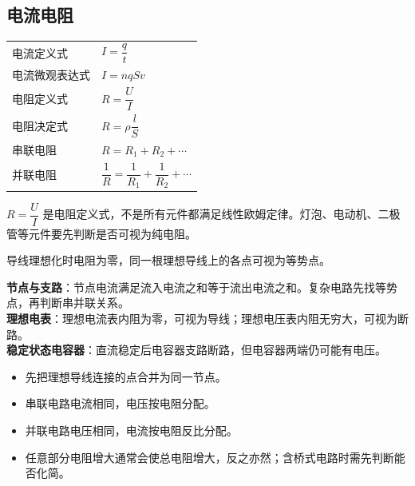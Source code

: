 
\subsection{电流电阻}

\begin{tabularx}{\columnwidth}{XX}
  电流定义式&$I=\dfrac{q}{t}$\\
  电流微观表达式&$I=nqSv$\\
  电阻定义式&$R=\dfrac{U}{I}$\\
  电阻决定式&$R=\rho\dfrac{l}{S}$\\
  串联电阻&$R=R_1+R_2+\cdots$\\
  并联电阻&$\dfrac1R=\dfrac1{R_1}+\dfrac1{R_2}+\cdots$\\
\end{tabularx}

\begin{formulanotebox}
$R=\dfrac{U}{I}$ 是电阻定义式，不是所有元件都满足线性欧姆定律。灯泡、电动机、二极管等元件要先判断是否可视为纯电阻。

导线理想化时电阻为零，同一根理想导线上的各点可视为等势点。
\end{formulanotebox}

\begin{keypointbox}[title={\strut\textcolor{white}{\bfseries 重点知识点：电路基本认识}}]
\textbf{节点与支路}：节点电流满足流入电流之和等于流出电流之和。复杂电路先找等势点，再判断串并联关系。\\

\textbf{理想电表}：理想电流表内阻为零，可视为导线；理想电压表内阻无穷大，可视为断路。\\

\textbf{稳定状态电容器}：直流稳定后电容器支路断路，但电容器两端仍可能有电压。
\end{keypointbox}

\begin{casetypebox}[title={\strut\textcolor{white}{\bfseries 常见题型：串并联化简}}]
\begin{itemize}[leftmargin=1.5em]
  \item 先把理想导线连接的点合并为同一节点。
  \item 串联电路电流相同，电压按电阻分配。
  \item 并联电路电压相同，电流按电阻反比分配。
  \item 任意部分电阻增大通常会使总电阻增大，反之亦然；含桥式电路时需先判断能否化简。
\end{itemize}
\end{casetypebox}
